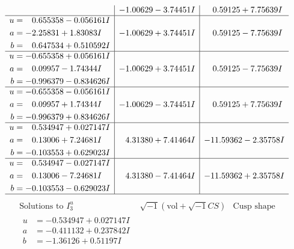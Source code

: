 \documentclass[1p]{elsarticle_modified}
\theoremstyle{definition}
\newcommand{\I}{\sqrt{-1}}
\begin{document}
$$\begin{array}{c|c|c}
 & -1.00629 - 3.74451 I & \phantom{-}0.59125 + 7.75639 I \\ \hline\begin{aligned}
u &= \phantom{-}0.655358 - 0.056161 I \\
a &= -2.25831 + 1.83083 I \\
b &= \phantom{-}0.647534 + 0.510592 I\end{aligned}
 & -1.00629 + 3.74451 I & \phantom{-}0.59125 - 7.75639 I \\ \hline\begin{aligned}
u &= -0.655358 + 0.056161 I \\
a &= \phantom{-}0.09957 - 1.74344 I \\
b &= -0.996379 - 0.834626 I\end{aligned}
 & -1.00629 + 3.74451 I & \phantom{-}0.59125 - 7.75639 I \\ \hline\begin{aligned}
u &= -0.655358 - 0.056161 I \\
a &= \phantom{-}0.09957 + 1.74344 I \\
b &= -0.996379 + 0.834626 I\end{aligned}
 & -1.00629 - 3.74451 I & \phantom{-}0.59125 + 7.75639 I \\ \hline\begin{aligned}
u &= \phantom{-}0.534947 + 0.027147 I \\
a &= \phantom{-}0.13006 + 7.24681 I \\
b &= -0.103553 + 0.629023 I\end{aligned}
 & \phantom{-}4.31380 + 7.41464 I & -11.59362 - 2.35758 I \\ \hline\begin{aligned}
u &= \phantom{-}0.534947 - 0.027147 I \\
a &= \phantom{-}0.13006 - 7.24681 I \\
b &= -0.103553 - 0.629023 I\end{aligned}
 & \phantom{-}4.31380 - 7.41464 I & -11.59362 + 2.35758 I\\
 \hline 
 \end{array}$$\newpage$$\begin{array}{c|c|c}  
\text{Solutions to }I^u_{3}& \I (\text{vol} + \sqrt{-1}CS) & \text{Cusp shape}\\
 \hline 
\begin{aligned}
u &= -0.534947 + 0.027147 I \\
a &= -0.411132 + 0.237842 I \\
b &= -1.36126 + 0.51197 I\end{aligned}

\end{array}$$
\end{document}
